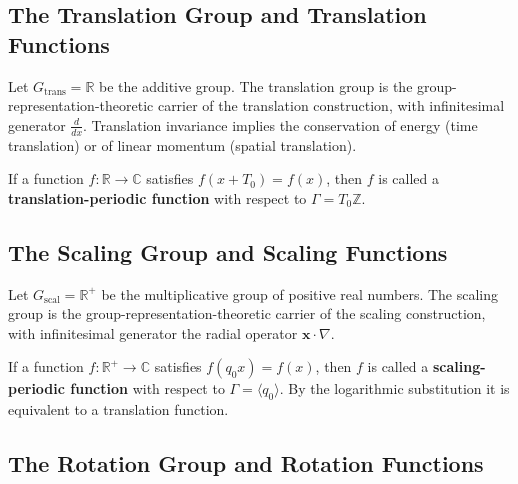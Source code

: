 \subsection{The Translation Group and Translation Functions}

\begin{definition}\label{def:translation_group_basic}
Let $G_{\text{trans}} = \mathbb{R}$ be the additive group. The translation group is the group-representation-theoretic carrier of the translation construction, with infinitesimal generator $\frac{d}{dx}$. Translation invariance implies the conservation of energy (time translation) or of linear momentum (spatial translation).
\end{definition}

\begin{definition}\label{def:translation_function_basic}
If a function $f: \mathbb{R} \to \mathbb{C}$ satisfies $f(x + T_0) = f(x)$, then $f$ is called a \textbf{translation-periodic function} with respect to $\Gamma = T_0\mathbb{Z}$.
\end{definition}

\subsection{The Scaling Group and Scaling Functions}

\begin{definition}\label{def:scaling_group_basic}
Let $G_{\text{scal}} = \mathbb{R}^+$ be the multiplicative group of positive real numbers. The scaling group is the group-representation-theoretic carrier of the scaling construction, with infinitesimal generator the radial operator $\mathbf{x} \cdot \nabla$.
\end{definition}

\begin{definition}\label{def:scaling_function_basic}
If a function $f: \mathbb{R}^+ \to \mathbb{C}$ satisfies $f(q_0 x) = f(x)$, then $f$ is called a \textbf{scaling-periodic function} with respect to $\Gamma = \langle q_0 \rangle$. By the logarithmic substitution it is equivalent to a translation function.
\end{definition}

\subsection{The Rotation Group and Rotation Functions}

